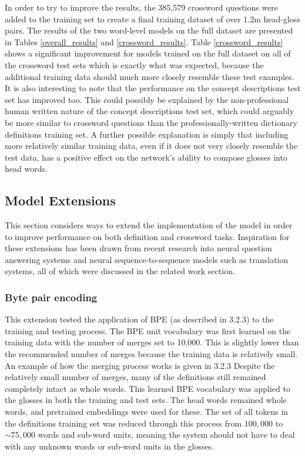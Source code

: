 \documentclass[11pt]{article}
\begin{document}
\begin{spacing}{1}
In order to try to improve the results, the 385,579 crossword questions were added to the training set to create a final training dataset of over 1.2m head-gloss pairs. The results of the two word-level models on the full dataset are presented in Tables \ref{overall_results} and \ref{crossword_results}. Table \ref{crossword_results} shows a significant improvement for models trained on the full dataset on all of the crossword test sets which is exactly what was expected, because the additional training data should much more closely resemble these test examples. It is also interesting to note that the performance on the concept descriptions test set has improved too. This could possibly be explained by the non-professional human written nature of the concept descriptions test set, which could arguably be more similar to crossword questions than the professionally-written dictionary definitions training set. A further possible explanation is simply that including more relatively similar training data, even if it does not very closely resemble the test data, has a positive effect on the network's ability to compose glosses into head words.

\subsection{Model Extensions}
This section considers ways to extend the implementation of the model in order to improve performance on both definition and crossword tasks. Inspiration for these extensions has been drawn from recent research into neural question answering systems and neural sequence-to-sequence models such as translation systems, all of which were discussed in the related work section.

\subsubsection{Byte pair encoding}
This extension tested the application of BPE (as described in 3.2.3) to the training and testing process. The BPE unit vocabulary was first learned on the training data with the number of merges set to 10,000. This is slightly lower than the recommended number of merges because the training data is relatively small. An example of how the merging process works is given in 3.2.3 Despite the relatively small number of merges, many of the definitions still remained completely intact as whole words. This learned BPE vocabulary was applied to the glosses in both the training and test sets. The head words remained whole words, and pretrained embeddings were used for these. The set of all tokens in the definitions training set was reduced through this process from $100,000$ to $\sim75,000$ words and sub-word units, meaning the system should not have to deal with any unknown words or sub-word units in the glosses.


\end{spacing}
\end{document}
